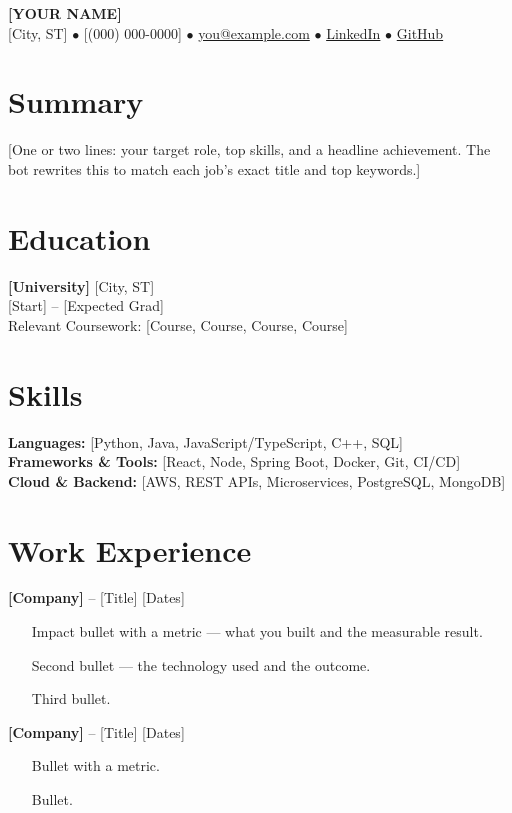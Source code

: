 \documentclass[a4paper,10pt]{article}
\begin{document}
\begin{center}
{\fontsize{16}{18}\selectfont \textbf{[YOUR NAME]}}\\[2pt]
\small [City, ST] $\bullet$ [(000) 000-0000] $\bullet$ \href{mailto:you@example.com}{you@example.com} $\bullet$ \href{https://linkedin.com/in/you}{LinkedIn} $\bullet$ \href{https://github.com/you}{GitHub}
\end{center}

\section*{Summary}
[One or two lines: your target role, top skills, and a headline achievement. The bot
rewrites this to match each job's exact title and top keywords.]

\section*{Education}
\textbf{[University]} \hfill [City, ST]\\
[Degree, Major] \hfill [Start] -- [Expected Grad]\\
Relevant Coursework: [Course, Course, Course, Course]

\section*{Skills}
\textbf{Languages:} [Python, Java, JavaScript/TypeScript, C++, SQL]\\
\textbf{Frameworks \& Tools:} [React, Node, Spring Boot, Docker, Git, CI/CD]\\
\textbf{Cloud \& Backend:} [AWS, REST APIs, Microservices, PostgreSQL, MongoDB]

\section*{Work Experience}
\textbf{[Company]} -- [Title] \hfill [Dates]
\begin{itemize}[leftmargin=*, itemsep=0pt]
  \item [Impact bullet with a metric — what you built and the measurable result.]
  \item [Second bullet — the technology used and the outcome.]
  \item [Third bullet.]
\end{itemize}

\textbf{[Company]} -- [Title] \hfill [Dates]
\begin{itemize}[leftmargin=*, itemsep=0pt]
  \item [Bullet with a metric.]
  \item [Bullet.]
\end{itemize}
\end{document}
